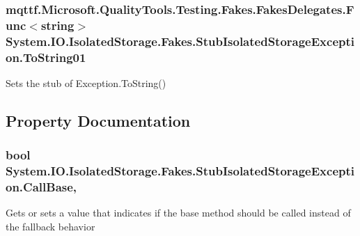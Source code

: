 \hypertarget{class_system_1_1_i_o_1_1_isolated_storage_1_1_fakes_1_1_stub_isolated_storage_exception_a4ef92ed2cbc9d6c567e8bb0315c49eba}{
\subsubsection[{To\-String01}]{\setlength{\rightskip}{0pt plus 5cm}mqttf.\-Microsoft.\-Quality\-Tools.\-Testing.\-Fakes.\-Fakes\-Delegates.\-Func$<$string$>$ System.\-I\-O.\-Isolated\-Storage.\-Fakes.\-Stub\-Isolated\-Storage\-Exception.\-To\-String01}}\label{class_system_1_1_i_o_1_1_isolated_storage_1_1_fakes_1_1_stub_isolated_storage_exception_a4ef92ed2cbc9d6c567e8bb0315c49eba}


Sets the stub of Exception.\-To\-String()



\subsection{Property Documentation}
\hypertarget{class_system_1_1_i_o_1_1_isolated_storage_1_1_fakes_1_1_stub_isolated_storage_exception_aa1e913107265f3f7be09f34b3b99bc5b}{
\subsubsection[{Call\-Base}]{\setlength{\rightskip}{0pt plus 5cm}bool System.\-I\-O.\-Isolated\-Storage.\-Fakes.\-Stub\-Isolated\-Storage\-Exception.\-Call\-Base\hspace{0.3cm}{\ttfamily [get]}, {\ttfamily [set]}}}\label{class_system_1_1_i_o_1_1_isolated_storage_1_1_fakes_1_1_stub_isolated_storage_exception_aa1e913107265f3f7be09f34b3b99bc5b}


Gets or sets a value that indicates if the base method should be called instead of the fallback behavior


